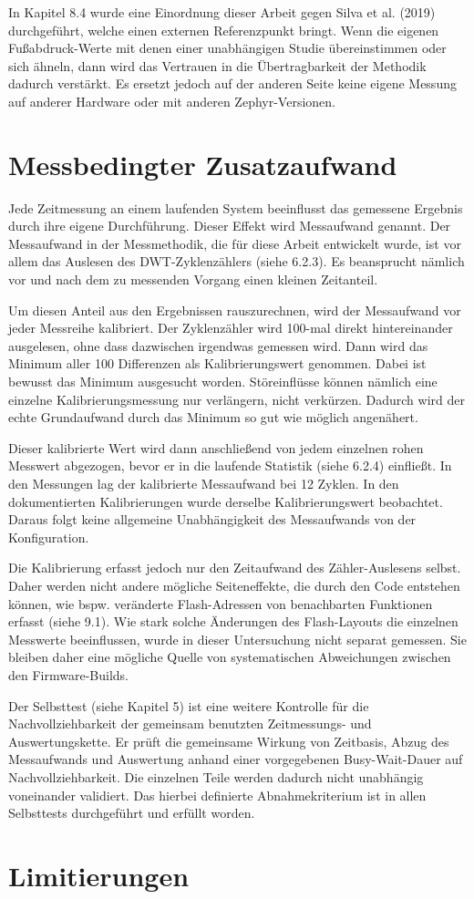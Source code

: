 In Kapitel 8.4 wurde eine Einordnung dieser Arbeit gegen Silva et al. (2019) durchgeführt, welche einen externen Referenzpunkt bringt. Wenn die eigenen Fußabdruck-Werte mit denen einer unabhängigen Studie übereinstimmen oder sich ähneln, dann wird das Vertrauen in die Übertragbarkeit der Methodik dadurch verstärkt. Es ersetzt jedoch auf der anderen Seite keine eigene Messung auf anderer Hardware oder mit anderen Zephyr-Versionen.

\section{Messbedingter Zusatzaufwand}
Jede Zeitmessung an einem laufenden System beeinflusst das gemessene Ergebnis durch ihre eigene Durchführung. Dieser Effekt wird Messaufwand genannt. Der Messaufwand in der Messmethodik, die für diese Arbeit entwickelt wurde, ist vor allem das Auslesen des DWT-Zyklenzählers (siehe 6.2.3). Es beansprucht nämlich vor und nach dem zu messenden Vorgang einen kleinen Zeitanteil.

Um diesen Anteil aus den Ergebnissen rauszurechnen, wird der Messaufwand vor jeder Messreihe kalibriert. Der Zyklenzähler wird 100-mal direkt hintereinander ausgelesen, ohne dass dazwischen irgendwas gemessen wird. Dann wird das Minimum aller 100 Differenzen als Kalibrierungswert genommen. Dabei ist bewusst das Minimum ausgesucht worden. Störeinflüsse können nämlich eine einzelne Kalibrierungsmessung nur verlängern, nicht verkürzen. Dadurch wird der echte Grundaufwand durch das Minimum so gut wie möglich angenähert.

Dieser kalibrierte Wert wird dann anschließend von jedem einzelnen rohen Messwert abgezogen, bevor er in die laufende Statistik (siehe 6.2.4) einfließt. In den Messungen lag der kalibrierte Messaufwand bei 12 Zyklen. In den dokumentierten Kalibrierungen wurde derselbe Kalibrierungswert beobachtet. Daraus folgt keine allgemeine Unabhängigkeit des Messaufwands von der Konfiguration.

Die Kalibrierung erfasst jedoch nur den Zeitaufwand des Zähler-Auslesens selbst. Daher werden nicht andere mögliche Seiteneffekte, die durch den Code entstehen können, wie bspw. veränderte Flash-Adressen von benachbarten Funktionen erfasst (siehe 9.1). Wie stark solche Änderungen des Flash-Layouts die einzelnen Messwerte beeinflussen, wurde in dieser Untersuchung nicht separat gemessen. Sie bleiben daher eine mögliche Quelle von systematischen Abweichungen zwischen den Firmware-Builds.

Der Selbsttest (siehe Kapitel 5) ist eine weitere Kontrolle für die Nachvollziehbarkeit der gemeinsam benutzten Zeitmessungs- und Auswertungskette. Er prüft die gemeinsame Wirkung von Zeitbasis, Abzug des Messaufwands und Auswertung anhand einer vorgegebenen Busy-Wait-Dauer auf Nachvollziehbarkeit. Die einzelnen Teile werden dadurch nicht unabhängig voneinander validiert. Das hierbei definierte Abnahmekriterium ist in allen Selbsttests durchgeführt und erfüllt worden.

\section{Limitierungen}
